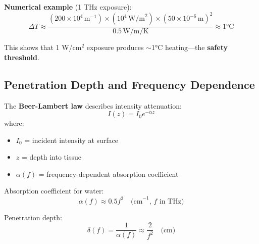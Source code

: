 \textbf{Numerical example} (1 THz exposure):
\begin{equation}
\Delta T \approx \frac{(200 \times 10^4\,\text{m}^{-1}) \times (10^4\,\text{W/m}^2) \times (50 \times 10^{-6}\,\text{m})^2}{0.5\,\text{W/m/K}} \approx 1°\text{C}
\end{equation}

This shows that 1 W/cm$^2$ exposure produces $\sim$1°C heating---the \textbf{safety threshold}.

\subsection{Penetration Depth and Frequency Dependence}

The \textbf{Beer-Lambert law} describes intensity attenuation:
\begin{equation}
I(z) = I_0 e^{-\alpha z}
\end{equation}
where:
\begin{itemize}
\item $I_0$ = incident intensity at surface
\item $z$ = depth into tissue
\item $\alpha(f)$ = frequency-dependent absorption coefficient
\end{itemize}

Absorption coefficient for water:
\begin{equation}
\alpha(f) \approx 0.5 f^2 \quad \text{(cm}^{-1}\text{, } f \text{ in THz)}
\end{equation}

Penetration depth:
\begin{equation}
\delta(f) = \frac{1}{\alpha(f)} \approx \frac{2}{f^2} \quad \text{(cm)}
\end{equation}

